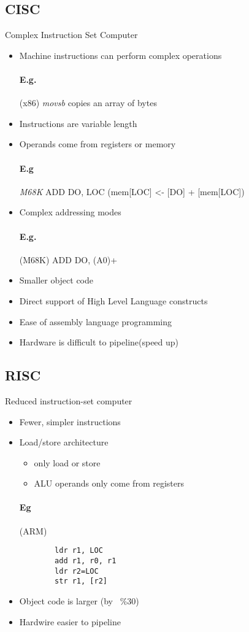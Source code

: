 \documentclass[12pt]{report}
\begin{document}
    \subsection{CISC} Complex Instruction Set Computer\\
      \begin{itemize}
        \item Machine instructions can perform complex operations
        \paragraph{E.g.} (x86) \textit{movsb} copies an array of bytes
        \item Instructions are variable length
        \item Operands come from registers or memory
        \paragraph{E.g} \textit{M68K} ADD DO, LOC (mem[LOC] \textless- [DO] +
        [mem[LOC])
        \item Complex addressing modes
        \paragraph{E.g.} (M68K) ADD DO, (A0)+
        \item Smaller object code
        \item Direct support of High Level Language constructs
        \item Ease of assembly language programming
        \item Hardware is difficult to pipeline(speed up)
      \end{itemize}

    \subsection{RISC}
      Reduced instruction-set computer
      \begin{itemize}
        \item Fewer, simpler instructions
        \item Load/store architecture
        \begin{itemize}
          \item only load or store
          \item ALU operands only come from registers
        \end{itemize}
      \paragraph{Eg} (ARM)
      \begin{lstlisting}
        ldr r1, LOC
        add r1, r0, r1
        ldr r2=LOC
        str r1, [r2]
      \end{lstlisting}
      \item Object code is larger (by ~\%30)
      \item Hardwire easier to pipeline
      \end{itemize}
\end{document}

